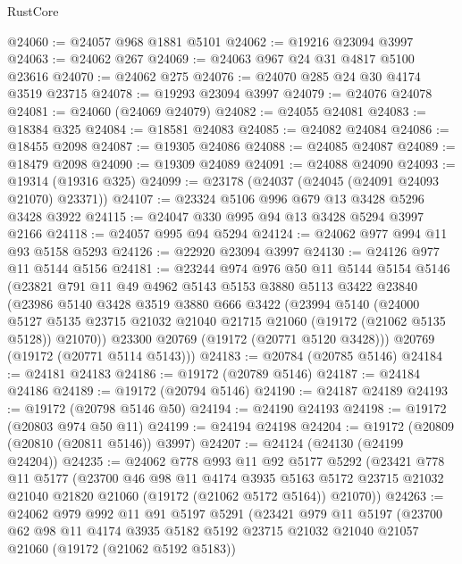 \begin{lexlean}{RustCore}
\begin{coremodule}
@24060 := @24057 @968 @1881 @5101
@24062 := @19216 @23094 @3997
@24063 := @24062 @267
@24069 := @24063 @967 @24 @31 @4817 @5100 @23616
@24070 := @24062 @275
@24076 := @24070 @285 @24 @30 @4174 @3519 @23715
@24078 := @19293 @23094 @3997
@24079 := @24076 @24078
@24081 := @24060 (@24069 @24079)
@24082 := @24055 @24081
@24083 := @18384 @325
@24084 := @18581 @24083
@24085 := @24082 @24084
@24086 := @18455 @2098
@24087 := @19305 @24086
@24088 := @24085 @24087
@24089 := @18479 @2098
@24090 := @19309 @24089
@24091 := @24088 @24090
@24093 := @19314 (@19316 @325)
@24099 := @23178 (@24037 (@24045 (@24091 @24093 @21070) @23371))
@24107 := @23324 @5106 @996 @679 @13 @3428 @5296 @3428 @3922
@24115 := @24047 @330 @995 @94 @13 @3428 @5294 @3997 @2166
@24118 := @24057 @995 @94 @5294
@24124 := @24062 @977 @994 @11 @93 @5158 @5293
@24126 := @22920 @23094 @3997
@24130 := @24126 @977 @11 @5144 @5156
@24181 := @23244
    @974
    @976
    @50
    @11
    @5144
    @5154
    @5146
    (@23821
      @791
      @11
      @49
      @4962
      @5143
      @5153
      @3880
      @5113
      @3422
      @23840
      (@23986
        @5140
        @3428
        @3519
        @3880
        @666
        @3422
        (@23994
          @5140
          (@24000
            @5127
            @5135
            @23715
            @21032
            @21040
            @21715
            @21060
            (@19172 (@21062 @5135 @5128))
            @21070))
        @23300
        @20769
        (@19172 (@20771 @5120 @3428)))
      @20769
      (@19172 (@20771 @5114 @5143)))
@24183 := @20784 (@20785 @5146)
@24184 := @24181 @24183
@24186 := @19172 (@20789 @5146)
@24187 := @24184 @24186
@24189 := @19172 (@20794 @5146)
@24190 := @24187 @24189
@24193 := @19172 (@20798 @5146 @50)
@24194 := @24190 @24193
@24198 := @19172 (@20803 @974 @50 @11)
@24199 := @24194 @24198
@24204 := @19172 (@20809 (@20810 (@20811 @5146)) @3997)
@24207 := @24124 (@24130 (@24199 @24204))
@24235 := @24062
    @778
    @993
    @11
    @92
    @5177
    @5292
    (@23421
      @778
      @11
      @5177
      (@23700
        @46
        @98
        @11
        @4174
        @3935
        @5163
        @5172
        @23715
        @21032
        @21040
        @21820
        @21060
        (@19172 (@21062 @5172 @5164))
        @21070))
@24263 := @24062
    @979
    @992
    @11
    @91
    @5197
    @5291
    (@23421
      @979
      @11
      @5197
      (@23700
        @62
        @98
        @11
        @4174
        @3935
        @5182
        @5192
        @23715
        @21032
        @21040
        @21057
        @21060
        (@19172 (@21062 @5192 @5183))

\end{coremodule}
\end{lexlean}
